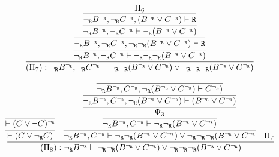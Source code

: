 \begin{enumerate}[(i)]
\begin{itemize}
            $$
                \infer{
                    (\Pi_7) : {\neg_\R} B^{\neg_\R}, {\neg_\R} C^{\neg_\R} \vdash {\neg_\R}{\neg_\R}(B^{\neg_\R} \vee C^{\neg_\R}) \vee {\neg_\R}{\neg_\R}{\neg_\R} (B^{\neg_\R} \vee C^{\neg_\R})
                }{
                    \infer{
                        {\neg_\R} B^{\neg_\R}, {\neg_\R} C^{\neg_\R} \vdash {\neg_\R}{\neg_\R}{\neg_\R} (B^{\neg_\R} \vee C^{\neg_\R})
                    }{
                        \infer{
                            {\neg_\R} B^{\neg_\R}, {\neg_\R} C^{\neg_\R}, {\neg_\R}{\neg_\R} (B^{\neg_\R} \vee C^{\neg_\R}) \vdash \R
                        }{
                            \infer{
                                {\neg_\R} B^{\neg_\R}, {\neg_\R} C^{\neg_\R} \vdash {\neg_\R} (B^{\neg_\R} \vee C^{\neg_\R})
                            }{
                                \infer{
                                    {\neg_\R} B^{\neg_\R}, {\neg_\R} C^{\neg_\R}, (B^{\neg_\R} \vee C^{\neg_\R}) \vdash \R
                                }{
                                    \Pi_6
                                }
                            }
                        }
                    }
                }
            $$

            $$
            \infer{
                (\Pi_8) : {\neg_\R} B^{\neg_\R} \vdash {\neg_\R}{\neg_\R}(B^{\neg_\R} \vee C^{\neg_\R}) \vee {\neg_\R}{\neg_\R}{\neg_\R} (B^{\neg_\R} \vee C^{\neg_\R})
            }{
                \infer{
                    \vdash (C \vee {\neg_\R} C)
                }{
                        \infer{\vdash (C \vee \neg C)^{\neg_\R}
                    }{
                    }
                }&
                \infer{
                    {\neg_\R} B^{\neg_\R}, C^{\neg_\R} \vdash {\neg_\R}{\neg_\R}(B^{\neg_\R} \vee C^{\neg_\R}) \vee {\neg_\R}{\neg_\R}{\neg_\R} (B^{\neg_\R} \vee C^{\neg_\R}
                }{
                    \infer{
                        {\neg_\R} B^{\neg_\R}, C^{\neg_\R} \vdash {\neg_\R}{\neg_\R}(B^{\neg_\R} \vee C^{\neg_\R})
                    }{
                        \infer
                        {
                            \Psi_3
                        }{
                            \infer{
                                {\neg_\R} B^{\neg_\R}, C^{\neg_\R}, {\neg_\R}(B^{\neg_\R} \vee C^{\neg_\R})\vdash (B^{\neg_\R} \vee C^{\neg_\R})
                            }{
                                \infer{
                                    {\neg_\R} B^{\neg_\R}, C^{\neg_\R}, {\neg_\R}(B^{\neg_\R} \vee C^{\neg_\R})\vdash C^{\neg_\R})
                                }{
                                }
                            }
                        }
                    }
                }&
                \Pi_7
            }
            $$
            

\end{itemize}
\end{enumerate}
